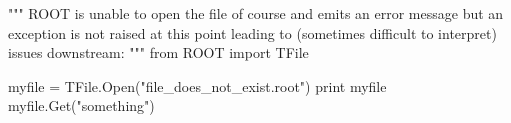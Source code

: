 \begin{footnotesize}
\begin{pyglist}[language=python,texcl=true,abovecaptionskip=0,style=vs,bgcolor=Moccasin]
"""
ROOT is unable to open the file of course and emits an error message but an
exception is not raised at this point leading to (sometimes difficult to
interpret) issues downstream:
"""
from ROOT import TFile

myfile = TFile.Open("file_does_not_exist.root")
print myfile
myfile.Get("something")
\end{pyglist}
\end{footnotesize}
